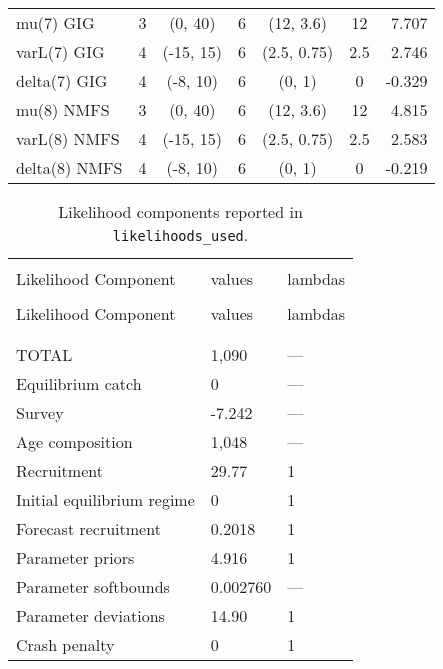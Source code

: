 \begin{table}[!h]
\begin{tabular}{lcccccr}
mu(7) GIG & 3 & (0, 40) & 6 & (12, 3.6) & 12 & 7.707 \\
varL(7) GIG & 4 & (-15, 15) & 6 & (2.5, 0.75) & 2.5 & 2.746 \\
delta(7) GIG & 4 & (-8, 10) & 6 & (0, 1) & 0 & -0.329 \\
mu(8) NMFS & 3 & (0, 40) & 6 & (12, 3.6) & 12 & 4.815 \\
varL(8) NMFS & 4 & (-15, 15) & 6 & (2.5, 0.75) & 2.5 & 2.583 \\
delta(8) NMFS & 4 & (-8, 10) & 6 & (0, 1) & 0 & -0.219 \\
\hline
\end{tabular}
\usefont{\encodingdefault}{\familydefault}{\seriesdefault}{\shapedefault}\normalsize
\end{table}

\clearpage

\setlength{\tabcolsep}{0pt}
\begin{longtable}[c]{>{\raggedright\let\newline\\\arraybackslash\hspace{0pt}}p{2.31in}>{\raggedleft\let\newline\\\arraybackslash\hspace{0pt}}p{1.35in}>{\raggedleft\let\newline\\\arraybackslash\hspace{0pt}}p{1.35in}}
  \caption{Likelihood components reported in \texttt{likelihoods\_used}.} \label{tab:like1}\\  \hline\\[-2.2ex]  
  Likelihood Component  & values & lambdas \\[0.2ex]\hline\\[-1.5ex]  \endfirsthead   \hline  
  Likelihood Component  & values & lambdas \\[0.2ex]\hline\\[-1.5ex]  \endhead  \hline\\[-2.2ex]   \endfoot  \hline \endlastfoot
  TOTAL & 1,090 & --- \\ 
  Equilibrium catch & 0 & --- \\ 
  Survey & -7.242 & --- \\ 
  Age composition & 1,048 & --- \\ 
  Recruitment & 29.77 & 1 \\ 
  Initial equilibrium regime & 0 & 1 \\ 
  Forecast recruitment & 0.2018 & 1 \\ 
  Parameter priors & 4.916 & 1 \\ 
  Parameter softbounds & 0.002760 & --- \\ 
  Parameter deviations & 14.90 & 1 \\ 
  Crash penalty & 0 & 1 \\ 
\end{longtable}\setlength{\tabcolsep}{0pt}

